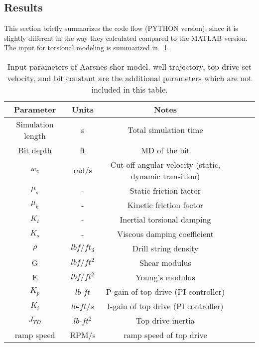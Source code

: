 \subsection{Results}
This section briefly summarizes the code flow (PYTHON version), since it is slightly different in the way they calculated compared to the MATLAB version. The input for torsional modeling is summarized in \tablename~\ref{AS_inptut_params}.

\begin{table}[!hbt]
\centering
\begin{tabular}{|c|c|c|c|c|c|}
\hline
Parameter & Units & Notes\\                                                              
\hline
Simulation length & s & Total simulation time \\                                                  
\hline
Bit depth & ft & MD of the bit \\                                                   
\hline
$w_c$ & rad/s & Cut-off angular velocity (static, dynamic transition)\\                                                              
\hline
$\mu_s$ & -& Static friction factor\\
\hline
$\mu_k$ & - & Kinetic friction factor \\ 
\hline
$K_t$ &- & Inertial torsional damping \\                                                  
\hline
$K_s$ &- & Viscous damping coefficient \\                                                   
\hline
$\rho$ & $lbf/ft_3$ & Drill string density \\                                                       
\hline
G & $lbf/ft^2$ & Shear modulus   \\                                                         
\hline
E & $lbf/ft^2$ & Young's modulus \\                                                              
\hline
$K_p$ & $lb$-$ft$ & P-gain of top drive (PI controller) \\
\hline
$K_i$ & $lb$-$ft/s$ &I-gain of top drive (PI controller)\\ 
\hline
$J_{TD}$ & $lb$-$ft^2$ & Top drive inertia \\
\hline
ramp speed & RPM/s & ramp speed of top drive\\
\hline
\end{tabular}
\caption[Input parameters of Aarsnes-Shor model]{Input parameters of Aarsnes-shor model. well trajectory, top drive set velocity, and bit constant are the additional parameters which are not included in this table.}\label{AS_inptut_params}
\end{table}

